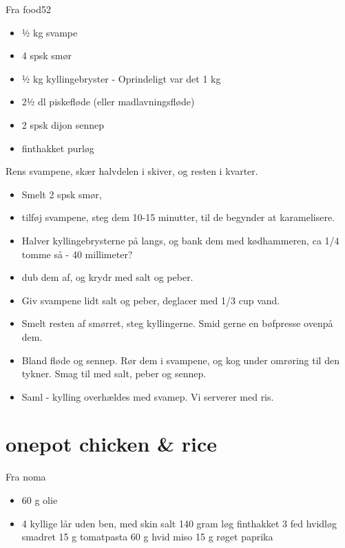 \documentclass[
]{book}
\providecommand{\tightlist}{%
  \setlength{\itemsep}{0pt}\setlength{\parskip}{0pt}}
\begin{document}
Fra food52

\begin{itemize}
\tightlist
\item
  ½ kg svampe
\item
  4 spsk smør
\item
  ½ kg kyllingebryster - Oprindeligt var det 1 kg
\item
  2½ dl piskefløde (eller madlavningsfløde)
\item
  2 spsk dijon sennep
\item
  finthakket purløg
\end{itemize}

Rens svampene, skær halvdelen i skiver, og resten i kvarter.

\begin{itemize}
\tightlist
\item
  Smelt 2 spsk smør,
\item
  tilføj svampene, steg dem 10-15 minutter, til
  de begynder at karamelisere.
\item
  Halver kyllingebrysterne på langs,
  og bank dem med kødhammeren, ca 1/4 tomme så - 40 millimeter?
\item
  dub dem af, og krydr med salt og peber.
\item
  Giv svampene lidt salt og peber, deglacer med 1/3 cup vand.
\item
  Smelt resten af smørret, steg kyllingerne. Smid gerne en
  bøfpresse ovenpå dem.
\item
  Bland fløde og sennep. Rør dem i svampene, og kog under omrøring
  til den tykner. Smag til med salt, peber og sennep.
\item
  Saml - kylling overhældes med svamep. Vi serverer med ris.
\end{itemize}

\hypertarget{onepot-chicken-rice}{%
\chapter{onepot chicken \& rice}\label{onepot-chicken-rice}}

Fra noma

\begin{itemize}
\tightlist
\item
  60 g olie
\item
  4 kyllige lår uden ben, med skin
  salt
  140 gram løg finthakket
  3 fed hvidløg smadret
  15 g tomatpasta
  60 g hvid miso
  15 g røget paprika
\end{itemize}
\end{document}
